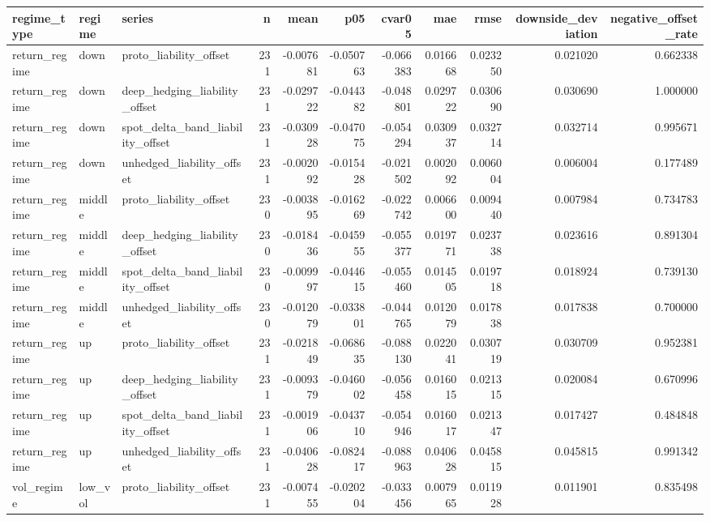 \begin{tabular}{lllrrrrrrrr}
\toprule
regime\_type & regime & series & n & mean & p05 & cvar05 & mae & rmse & downside\_deviation & negative\_offset\_rate \\
\midrule
return\_regime & down & proto\_liability\_offset & 231 & -0.007681 & -0.050763 & -0.066383 & 0.016668 & 0.023250 & 0.021020 & 0.662338 \\
return\_regime & down & deep\_hedging\_liability\_offset & 231 & -0.029722 & -0.044382 & -0.048801 & 0.029722 & 0.030690 & 0.030690 & 1.000000 \\
return\_regime & down & spot\_delta\_band\_liability\_offset & 231 & -0.030928 & -0.047075 & -0.054294 & 0.030937 & 0.032714 & 0.032714 & 0.995671 \\
return\_regime & down & unhedged\_liability\_offset & 231 & -0.002092 & -0.015428 & -0.021502 & 0.002092 & 0.006004 & 0.006004 & 0.177489 \\
return\_regime & middle & proto\_liability\_offset & 230 & -0.003895 & -0.016269 & -0.022742 & 0.006600 & 0.009440 & 0.007984 & 0.734783 \\
return\_regime & middle & deep\_hedging\_liability\_offset & 230 & -0.018436 & -0.045955 & -0.055377 & 0.019771 & 0.023738 & 0.023616 & 0.891304 \\
return\_regime & middle & spot\_delta\_band\_liability\_offset & 230 & -0.009997 & -0.044615 & -0.055460 & 0.014505 & 0.019718 & 0.018924 & 0.739130 \\
return\_regime & middle & unhedged\_liability\_offset & 230 & -0.012079 & -0.033801 & -0.044765 & 0.012079 & 0.017838 & 0.017838 & 0.700000 \\
return\_regime & up & proto\_liability\_offset & 231 & -0.021849 & -0.068635 & -0.088130 & 0.022041 & 0.030719 & 0.030709 & 0.952381 \\
return\_regime & up & deep\_hedging\_liability\_offset & 231 & -0.009379 & -0.046002 & -0.056458 & 0.016015 & 0.021315 & 0.020084 & 0.670996 \\
return\_regime & up & spot\_delta\_band\_liability\_offset & 231 & -0.001906 & -0.043710 & -0.054946 & 0.016017 & 0.021347 & 0.017427 & 0.484848 \\
return\_regime & up & unhedged\_liability\_offset & 231 & -0.040628 & -0.082417 & -0.088963 & 0.040628 & 0.045815 & 0.045815 & 0.991342 \\
vol\_regime & low\_vol & proto\_liability\_offset & 231 & -0.007455 & -0.020204 & -0.033456 & 0.007965 & 0.011928 & 0.011901 & 0.835498 \\

\end{tabular}
